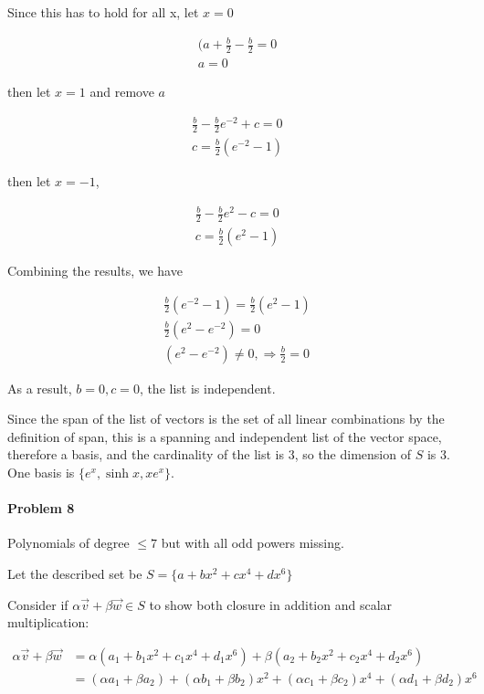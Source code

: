 \documentclass{article}
\begin{document}
Since this has to hold for all x, let $x = 0$

\begin{align*}
(a+\frac{b}{2} - \frac{b}{2} = 0 \\
a = 0
\end{align*}

then let $x = 1$ and remove $a$

\begin{align*}
\frac{b}{2} - \frac{b}{2} e^{-2} + c = 0 \\
c = \frac{b}{2}(e^{-2}-1)
\end{align*}

then let $x = -1$,

\begin{align*}
\frac{b}{2} - \frac{b}{2} e^2 - c = 0 \\
c = \frac{b}{2} (e^2 - 1)
\end{align*}

Combining the results, we have

\begin{align*}
\frac{b}{2} (e^{-2}-1) = \frac{b}{2} (e^2-1) \\
\frac{b}{2} (e^2 - e^{-2}) = 0 \\
(e^2 - e^{-2}) \neq 0, \Rightarrow \frac{b}{2} = 0
\end{align*}

As a result, $b = 0, c = 0$, the list is independent.

Since the span of the list of vectors is the set of all linear combinations by the definition of span, this is a spanning and independent list of the vector space, therefore a basis, and the cardinality of the list is 3, so the dimension of $S$ is 3. One basis is $\{ e^x, \sinh x, xe^x\}$.

\paragraph{Problem 8}
Polynomials of degree $\leq 7$ but with all odd powers missing.

Let the described set be $S = \{ a + bx^2 + cx^4 + dx^6 \}$

Consider if $\alpha \vec{v} + \beta \vec{w} \in S$ to show both closure in addition and scalar multiplication:

\begin{align*}
\alpha \vec{v} + \beta \vec{w} &= \alpha (a_1 + b_1 x^2 + c_1 x^4 + d_1 x^6) + \beta (a_2 + b_2 x^2 + c_2 x^4 + d_2 x^6) \\
&= (\alpha a_1 + \beta a_2) + (\alpha b_1 + \beta b_2) x^2 + (\alpha c_1 + \beta c_2) x^4 + (\alpha d_1 + \beta d_2) x^6
\end{align*}
\end{document}
